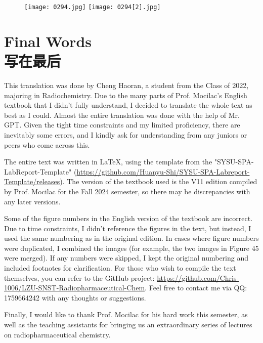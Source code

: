 \documentclass[dvipsnames, svgnames,a4paper,11pt]{article}
\begin{document}
\begin{figure}[h]
    \centering
    \texttt{[image: 0294.jpg]} \hspace{0.2in}
    \texttt{[image: 0294[2].jpg]}  
     \label{fig387}
\end{figure}


\newpage

\section{Final Words \\ 写在最后}

This translation was done by Cheng Haoran, a student from the Class of 2022, majoring in Radiochemistry. Due to the many parts of Prof. Mocilac's English textbook that I didn't fully understand, I decided to translate the whole text as best as I could. Almost the entire translation was done with the help of Mr. GPT. Given the tight time constraints and my limited proficiency, there are inevitably some errors, and I kindly ask for understanding from any juniors or peers who come across this.

The entire text was written in \LaTeX, using the template from the "SYSU-SPA-LabReport-Template" (\url{https://github.com/Huanyu-Shi/SYSU-SPA-Labreport-Template/releases}). The version of the textbook used is the V11 edition compiled by Prof. Mocilac for the Fall 2024 semester, so there may be discrepancies with any later versions.

Some of the figure numbers in the English version of the textbook are incorrect. Due to time constraints, I didn’t reference the figures in the text, but instead, I used the same numbering as in the original edition. In cases where figure numbers were duplicated, I combined the images (for example, the two images in Figure 45 were merged). If any numbers were skipped, I kept the original numbering and included footnotes for clarification. For those who wish to compile the text themselves, you can refer to the GitHub project: \url{https://github.com/Chris-1006/LZU-SNST-Radiopharmaceutical-Chem}. Feel free to contact me via QQ: 1759664242 with any thoughts or suggestions.

Finally, I would like to thank Prof. Mocilac for his hard work this semester, as well as the teaching assistants for bringing us an extraordinary series of lectures on radiopharmaceutical chemistry.
\end{document}
